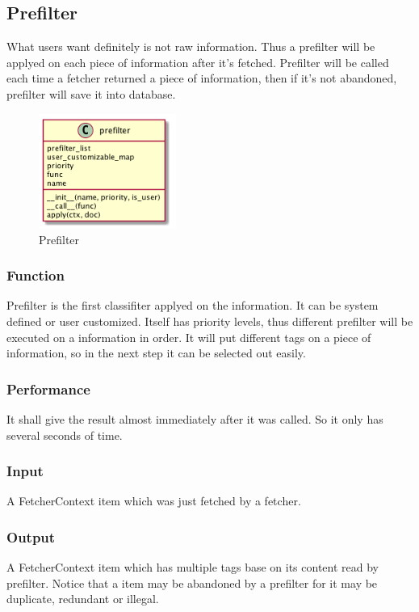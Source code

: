 
\subsection{Prefilter}
  What users want definitely is not raw information. Thus a prefilter will be applyed on each piece of information after it's fetched.
  Prefilter will be called each time a fetcher returned a piece of information, then if it's not abandoned, prefilter will save it into database.

  \begin{figure}[H]
    \centering
    \includegraphics[width=0.4\textwidth]{img/prefilter.png}
    \caption{Prefilter\label{fig:prefilter}}
  \end{figure}

  \subsubsection{Function}
    Prefilter is the first classifiter applyed on the information. It can be system defined or user customized.
    Itself has priority levels, thus different prefilter will be executed on a information in order.
    It will put different tags on a piece of information, so in the next step it can be selected out easily.

  \subsubsection{Performance}
    It shall give the result almost immediately after it was called. So it only has several seconds of time.

  \subsubsection{Input}
    A FetcherContext item which was just fetched by a fetcher.

  \subsubsection{Output}
    A FetcherContext item which has multiple tags base on its content read by prefilter.
    Notice that a item may be abandoned by a prefilter for it may be duplicate, redundant or illegal.


